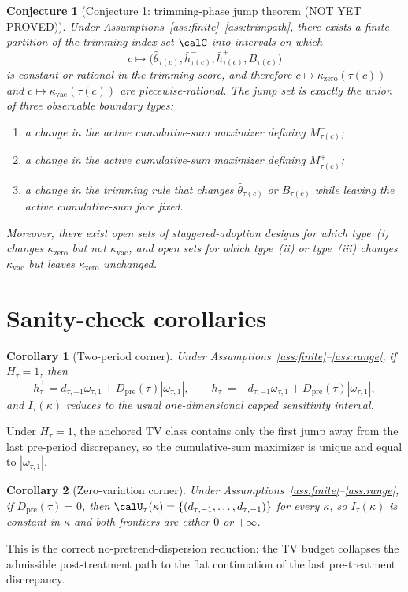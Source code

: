 \documentclass[11pt]{article}
\theoremstyle{definition}
\theoremstyle{plain}
\newtheorem{conjecture}{Conjecture}
\newtheorem{corollary}{Corollary}
\theoremstyle{remark}
\begin{document}
\begin{conjecture}[Conjecture 1: trimming-phase jump theorem (NOT YET PROVED)]\label{conj:jumps}
Under Assumptions~\ref{ass:finite}--\ref{ass:trimpath}, there exists a finite partition of the trimming-index set \(\calC\) into intervals on which
\[
  c\mapsto
  \big(
    \hat\theta_{\tau(c)},
    \bar h_{\tau(c)}^{-},
    \bar h_{\tau(c)}^{+},
    B_{\tau(c)}
  \big)
\]
is constant or rational in the trimming score, and therefore \(c\mapsto \kappa_{\mathrm{zero}}(\tau(c))\) and \(c\mapsto \kappa_{\mathrm{vac}}(\tau(c))\) are piecewise-rational. The jump set is exactly the union of three observable boundary types:
\begin{enumerate}[label=(\roman*)]
\item a change in the active cumulative-sum maximizer defining \(M_{\tau(c)}^{-}\);
\item a change in the active cumulative-sum maximizer defining \(M_{\tau(c)}^{+}\);
\item a change in the trimming rule that changes \(\hat\theta_{\tau(c)}\) or \(B_{\tau(c)}\) while leaving the active cumulative-sum face fixed.
\end{enumerate}
Moreover, there exist open sets of staggered-adoption designs for which type~(i) changes \(\kappa_{\mathrm{zero}}\) but not \(\kappa_{\mathrm{vac}}\), and open sets for which type~(ii) or type~(iii) changes \(\kappa_{\mathrm{vac}}\) but leaves \(\kappa_{\mathrm{zero}}\) unchanged.
\end{conjecture}

\section{Sanity-check corollaries}
\begin{corollary}[Two-period corner]\label{cor:twoperiod}
Under Assumptions~\ref{ass:finite}--\ref{ass:range}, if \(H_\tau=1\), then
\[
  \bar h_\tau^{+}=d_{\tau,-1}\omega_{\tau,1}+D_{\mathrm{pre}}(\tau)|\omega_{\tau,1}|,
  \qquad
  \bar h_\tau^{-}=-d_{\tau,-1}\omega_{\tau,1}+D_{\mathrm{pre}}(\tau)|\omega_{\tau,1}|,
\]
and \(I_\tau(\kappa)\) reduces to the usual one-dimensional capped sensitivity interval.
\end{corollary}
Under \(H_\tau=1\), the anchored TV class contains only the first jump away from the last pre-period discrepancy, so the cumulative-sum maximizer is unique and equal to \(|\omega_{\tau,1}|\).

\begin{corollary}[Zero-variation corner]\label{cor:zerovar}
Under Assumptions~\ref{ass:finite}--\ref{ass:range}, if \(D_{\mathrm{pre}}(\tau)=0\), then \(\calU_\tau(\kappa)=\{(d_{\tau,-1},\ldots,d_{\tau,-1})\}\) for every \(\kappa\), so \(I_\tau(\kappa)\) is constant in \(\kappa\) and both frontiers are either \(0\) or \(+\infty\).
\end{corollary}
This is the correct no-pretrend-dispersion reduction: the TV budget collapses the admissible post-treatment path to the flat continuation of the last pre-treatment discrepancy.
\end{document}
